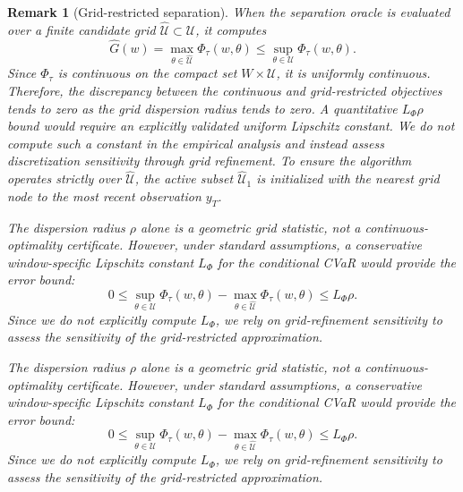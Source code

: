\documentclass[11pt, a4paper]{article}
\newtheorem{remark}{Remark}
\begin{document}
\begin{remark}[Grid-restricted separation]
When the separation oracle is evaluated over a finite candidate grid $\widehat{\mathcal{U}} \subset \mathcal{U}$, it computes
\begin{equation}
\widehat{G}(w) = \max_{\theta \in \widehat{\mathcal{U}}} \Phi_\tau(w, \theta) \le \sup_{\theta \in \mathcal{U}} \Phi_\tau(w, \theta).
\end{equation}
Since $\Phi_\tau$ is continuous on the compact set $W \times \mathcal{U}$, it is uniformly continuous. Therefore, the discrepancy between the continuous and grid-restricted objectives tends to zero as the grid dispersion radius tends to zero. A quantitative $L_\Phi\rho$ bound would require an explicitly validated uniform Lipschitz constant. We do not compute such a constant in the empirical analysis and instead assess discretization sensitivity through grid refinement. To ensure the algorithm operates strictly over $\widehat{\mathcal{U}}$, the active subset $\widehat{\mathcal{U}}_1$ is initialized with the nearest grid node to the most recent observation $y_T$.


The dispersion radius $\rho$ alone is a geometric grid statistic, not a continuous-optimality certificate. However, under standard assumptions, a conservative window-specific Lipschitz constant $L_\Phi$ for the conditional CVaR would provide the error bound:
\begin{equation}
0 \le \sup_{\theta \in \mathcal{U}} \Phi_\tau(w, \theta) - \max_{\theta \in \widehat{\mathcal{U}}} \Phi_\tau(w, \theta) \le L_\Phi \rho.
\end{equation}
Since we do not explicitly compute $L_\Phi$, we rely on grid-refinement sensitivity to assess the sensitivity of the grid-restricted approximation.



The dispersion radius $\rho$ alone is a geometric grid statistic, not a continuous-optimality certificate. However, under standard assumptions, a conservative window-specific Lipschitz constant $L_\Phi$ for the conditional CVaR would provide the error bound:
\begin{equation}
0 \le \sup_{\theta \in \mathcal{U}} \Phi_\tau(w, \theta) - \max_{\theta \in \widehat{\mathcal{U}}} \Phi_\tau(w, \theta) \le L_\Phi \rho.
\end{equation}
Since we do not explicitly compute $L_\Phi$, we rely on grid-refinement sensitivity to assess the sensitivity of the grid-restricted approximation.

\end{remark}
\end{document}
